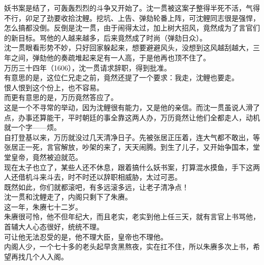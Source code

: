 \begin{multicols}{\theparacolNo}
妖书案是结了，可轰轰烈烈的斗争又开始了。沈一贯被这案子整得半死不活，气得不行，卯足了劲要收拾沈鲤。挖坑、上告、弹劾轮番上阵，可沈鲤同志很是强悍，怎么搞都没倒。反倒是沈一贯，由于闹得太过，加上树大招风，竟然成为了言官们的新目标。骂他的人越来越多，后来竟然成了时尚（弹劾日众）。\\

沈一贯眼看形势不妙，只好回家躲起来，想要避避风头，没想到这风越刮越大，三年之间，弹劾他的奏疏堆起来足有一人高，于是他再也顶不住了。\\

万历三十四年（1606），沈一贯请求辞职，得到批准。\\

有意思的是，这位仁兄走之前，竟然还提了一个要求：我走，沈鲤也要走。\\

恨人恨到这个份上，也不容易。\\

而更有意思的是，万历竟然答应了。\\

这是一个不寻常的举动，因为沈鲤很有能力，又是他的亲信。而沈一贯虽说人滑了点，办事还算能干，平时朝廷的事全靠这两人办，万历竟然让他们全都走人，动机就一个字——烦。\\

自打登基以来，万历就没过几天清净日子。先被张居正压着，连大气都不敢出，等张居正一死，言官解放，吵架的来了，天天闹腾。到生了儿子，又开始争国本，堂堂皇帝，竟然被迫就范。\\

现在太子也立了，某些人还不休息，跟着搞什么妖书案，打算混水摸鱼，手下这两人还借机斗来斗去，时不时还以辞职相威胁，太过可恶。\\

既然如此，你们就都滚吧，有多远滚多远，让老子清净点！\\

沈一贯和沈鲤走了，内阁只剩下了朱赓。\\

这一年，朱赓七十二岁。\\

朱赓很可怜，他不但年纪大，而且老实，老实到他上任三天，就有言官上书骂他，首辅大人心态很好，统统不理。\\

可让他无法忍受的是，他不理大臣，皇帝也不理他。\\

内阁人少，一个七十多的老头起早贪黑熬夜，实在扛不住，所以朱赓多次上书，希望再找几个人入阁。\\


\end{multicols}
